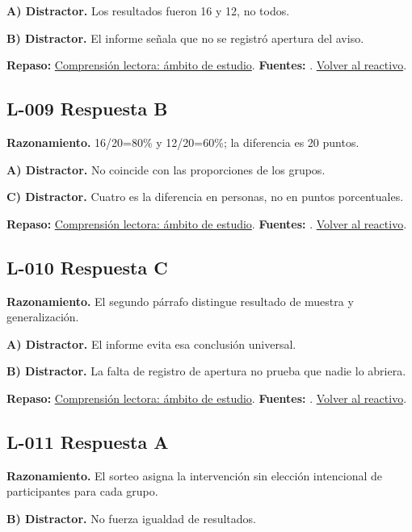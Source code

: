 \textbf{A) Distractor. }Los resultados fueron 16 y 12, no todos.

\textbf{B) Distractor. }El informe señala que no se registró apertura del aviso.

\textbf{Repaso:} \hyperref[sec:l1]{Comprensión lectora: ámbito de estudio}. \textbf{Fuentes:} \cite{ceneval,reading}. \hyperref[q:L-008]{Volver al reactivo}.\par\medskip

\subsection*{L-009 \quad Respuesta B}\label{s:L-009}
\textbf{Razonamiento.} 16/20=80\% y 12/20=60\%; la diferencia es 20 puntos.

\textbf{A) Distractor. }No coincide con las proporciones de los grupos.

\textbf{C) Distractor. }Cuatro es la diferencia en personas, no en puntos porcentuales.

\textbf{Repaso:} \hyperref[sec:l1]{Comprensión lectora: ámbito de estudio}. \textbf{Fuentes:} \cite{ceneval,reading}. \hyperref[q:L-009]{Volver al reactivo}.\par\medskip

\subsection*{L-010 \quad Respuesta C}\label{s:L-010}
\textbf{Razonamiento.} El segundo párrafo distingue resultado de muestra y generalización.

\textbf{A) Distractor. }El informe evita esa conclusión universal.

\textbf{B) Distractor. }La falta de registro de apertura no prueba que nadie lo abriera.

\textbf{Repaso:} \hyperref[sec:l1]{Comprensión lectora: ámbito de estudio}. \textbf{Fuentes:} \cite{ceneval,reading}. \hyperref[q:L-010]{Volver al reactivo}.\par\medskip

\subsection*{L-011 \quad Respuesta A}\label{s:L-011}
\textbf{Razonamiento.} El sorteo asigna la intervención sin elección intencional de participantes para cada grupo.

\textbf{B) Distractor. }No fuerza igualdad de resultados.

